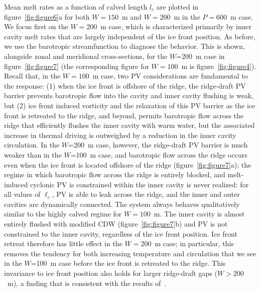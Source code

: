\documentclass[draft]{agujournal2019}
\begin{document}
Mean melt rates as a function of calved length $l_c$ are plotted in figure~\ref{fig:figure6}a for both $W=150$~m and $W=200$~m in the $P = 600$~m case. We focus first on the $W = 200$~m case, which is characterized primarily by inner cavity melt rates that are largely independent of the ice front position. As before, we use the barotropic streamfunction to diagnose the behavior. This is shown, alongside zonal and meridional cross-sections, for the $W$=200~m case in  figure~\ref{fig:figure7} (the corresponding figure for $W = 100$~m is figure~\ref{fig:figure4}). Recall that, in the $W=100$~m case, two PV considerations are fundamental to the response: (1) when the ice front is offshore of the ridge, the ridge-draft PV barrier prevents barotropic flow into the cavity and inner cavity flushing is weak, but (2) ice front induced vorticity and the relaxation of this PV barrier as the ice front is retreated to the ridge, and beyond, permits barotropic flow across the ridge that efficiently flushes the inner cavity with warm water, but the associated increase in thermal driving is outweighed by a reduction in the inner cavity circulation. In the $W$=200~m case, however, the ridge-draft PV barrier is much weaker than in the $W$=100~m case, and barotropic flow across the ridge occurs even when the ice front is located offshore of the ridge (figure~\ref{fig:figure7}a); the regime in which barotropic flow across the ridge is entirely blocked, and melt-induced cyclonic PV is constrained within the inner cavity is never realized: for all values of $\ell_c$, PV is able to leak across the ridge, and the inner and outer cavities are dynamically connected. The system always behaves qualitatively similar to the highly calved regime for $W = 100$~m. The inner cavity is almost entirely flushed with modified CDW (figure~\ref{fig:figure7}b) and PV is not constrained to the inner cavity, regardless of the ice front position. Ice front retreat therefore has little effect in the $W = 200$~m case; in particular, this removes the tendency for both increasing temperature and circulation that we see in the $W$=100~m case before the ice front is retreated to the ridge. This invariance to ice front position also holds for larger ridge-draft gaps ($W>200$~m), a finding that is consistent with the results of~.
\end{document}
